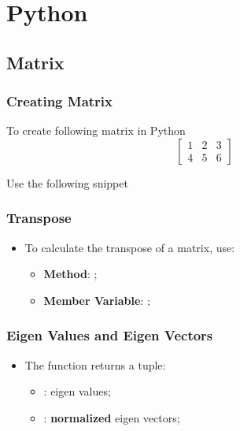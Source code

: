 \chapter{Python}

\section{Matrix}

  \subsection{Creating Matrix}
  
    To create following matrix in Python
    \begin{displaymath}
      \begin{bmatrix}
        1 & 2 & 3 \\
        4 & 5 & 6
      \end{bmatrix}
    \end{displaymath}
    
    Use the following snippet
    
  \subsection{Transpose}
  
    \begin{itemize}
      \item To calculate the transpose of a matrix, use:
      \begin{itemize}
        \item \textbf{Method}: ;
        \item \textbf{Member Variable}: ;
      \end{itemize}
    \end{itemize}
    
  \subsection{Eigen Values and Eigen Vectors}
  
    \begin{itemize}
      \item The function  returns a tuple:
      \begin{itemize}
        \item {}: eigen values;
        \item {}: \textbf{normalized} eigen vectors;
      \end{itemize}
    \end{itemize}